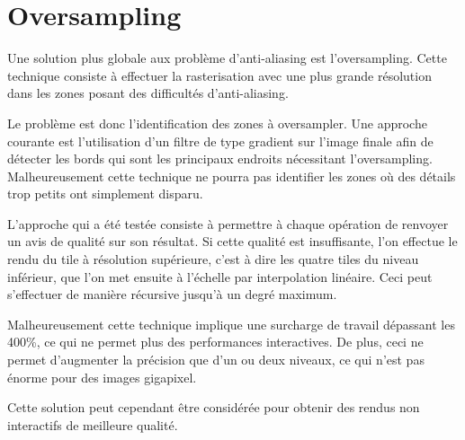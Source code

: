 		\section{Oversampling}
			Une solution plus globale aux problème d'anti-aliasing est l'oversampling\cite{shirley}. Cette
			technique consiste à effectuer la rasterisation avec une plus grande résolution dans les zones
			posant des difficultés d'anti-aliasing. 

			Le problème est donc l'identification des zones à oversampler. Une approche courante est l'utilisation
			d'un filtre de type gradient sur l'image finale afin de détecter les bords qui sont les principaux 
			endroits nécessitant l'oversampling. Malheureusement cette technique ne pourra pas identifier les zones
			où des détails trop petits ont simplement disparu.

			L'approche qui a été testée consiste à permettre à chaque opération de renvoyer un avis de qualité sur
			son résultat. Si cette qualité est insuffisante, l'on effectue le rendu
			du tile à résolution supérieure, c'est à dire les quatre tiles du niveau inférieur, que l'on met
			ensuite à l'échelle par interpolation linéaire. Ceci peut s'effectuer de manière récursive jusqu'à un degré
			maximum.

			Malheureusement cette technique implique une surcharge de travail dépassant les 400\%, ce qui ne permet plus
			des performances interactives. De plus, ceci ne permet d'augmenter la précision que d'un ou deux niveaux, ce
			qui n'est pas énorme pour des images gigapixel. 

			Cette solution peut cependant être considérée pour obtenir des rendus non interactifs de meilleure qualité.





